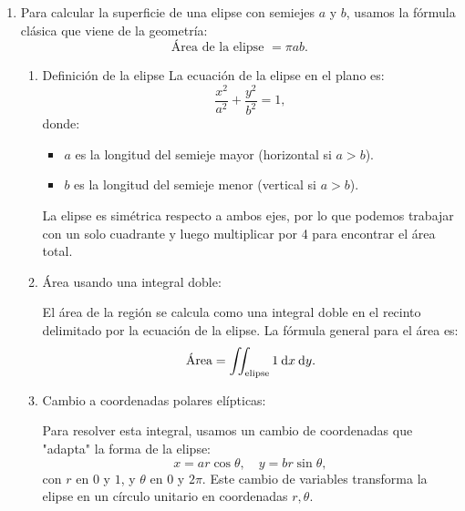 \begin{enumerate}[label=\color{red}\textbf{\arabic*)}, leftmargin=*]
\begin{enumerate}[label=\color{red}\textbf{\alph*)}]
\item {}

  Para calcular la superficie de una elipse con semiejes $a$ y  $b$, usamos la fórmula clásica que viene de la geometría:  \[
  \text{Área de la elipse }=\pi ab
  .\] 
  \begin{enumerate}[label=\arabic*)]
    \item Definición de la elipse
      La ecuación de la elipse en el plano es: \[
      \dfrac{x^2}{a^2}+\dfrac{y^2}{b^2}=1,
      \] donde:
      \begin{itemize}[label=\textbullet]
        \item $a$ es la longitud del semieje mayor (horizontal si  $a>b$).
        \item $b$ es la longitud del semieje menor (vertical si  $a>b$).
      \end{itemize}
      La elipse es simétrica respecto a ambos ejes, por lo que podemos trabajar con un solo cuadrante y luego multiplicar por 4 para encontrar el área total.

    \item Área usando una integral doble:

      El área de la región se calcula como una integral doble en el recinto delimitado por la ecuación de la elipse. La fórmula general para el área es: \[
      \text{Área}=\iint_{\text{elipse}}1\:\mathrm{d}x \:\mathrm{d}y
      .\] 
    \item Cambio a coordenadas polares elípticas:

      Para resolver esta integral, usamos un cambio de coordenadas que "adapta" la forma de la elipse: \[
      x=ar\cos\theta,\quad y=br\sin\theta,
      \]con $r$ en $0$ y $1$, y $\theta$ en $0$ y  $2\pi$. Este cambio de variables transforma la elipse en un círculo unitario en coordenadas $r,\theta$.


\end{enumerate}
\end{enumerate}
\end{enumerate}
